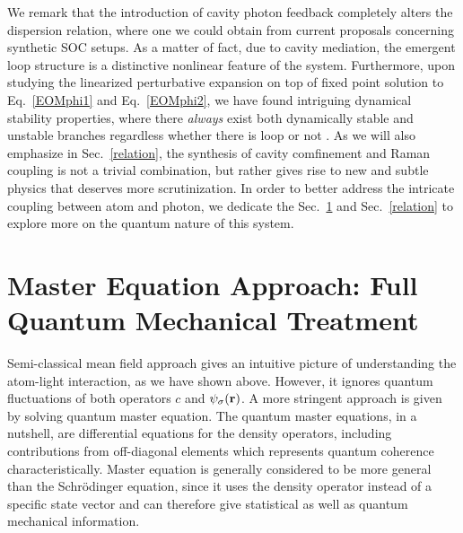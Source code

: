 \documentclass[atoms,article,submit,moreauthors,pdftex,12pt,a4paper]{mdpi}
\begin{document}
We remark that the introduction of cavity photon feedback completely alters the dispersion relation, where one we could obtain from current proposals concerning synthetic SOC setups. As a matter of fact, due to cavity mediation, the emergent loop structure is a distinctive nonlinear feature of the system. Furthermore, upon studying the linearized perturbative expansion on top of fixed point solution to Eq.~\ref{EOMphi1} and Eq.~\ref{EOMphi2}, we have found intriguing dynamical stability properties, where there {\em always} exist both dynamically stable and unstable branches regardless whether there is loop or not \cite{cavitySOC}. As we will also emphasize in Sec.~\ref{relation}, the synthesis of cavity comfinement and Raman coupling is not a trivial combination, but rather gives rise to new and subtle physics that deserves more scrutinization. In order to better address the intricate coupling between atom and photon, we dedicate the Sec.~\ref{master} and Sec.~\ref{relation} to explore more on the quantum nature of this system. 

\section{Master Equation Approach: Full Quantum Mechanical Treatment } \label{master}

Semi-classical mean field approach gives an intuitive picture of understanding the atom-light interaction, as we have shown above. However, it ignores quantum fluctuations of both operators $c$ and $\psi_\sigma({\bf r})$. A more stringent approach is given by solving quantum master equation.
The quantum master equations, in a nutshell, are differential equations for the density operators, including contributions from off-diagonal elements which represents quantum coherence characteristically.
Master equation is generally considered to be more general than the Schr\"{o}dinger equation, since it uses the density operator instead of a specific state vector and can therefore give statistical as well as quantum mechanical information. 
\end{document}
